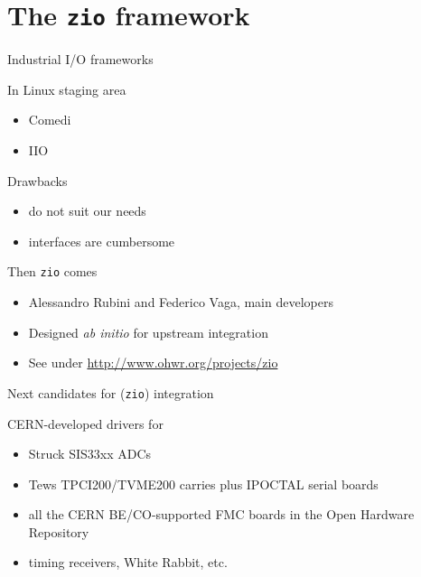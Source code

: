 \documentclass[compress,red]{beamer}
\begin{document}
\section{The \texttt{zio} framework}

\begin{frame}{Industrial I/O frameworks}

\pause
\begin{block}{In Linux staging area}
\begin{itemize}
\item Comedi
\item IIO
\end{itemize}
\end{block}

\pause
\begin{block}{Drawbacks}
\begin{itemize}
\item do not suit our needs
\item interfaces are cumbersome
\end{itemize}
\end{block}

\pause
\begin{block}{Then \texttt{zio} comes}
\begin{itemize}
\item Alessandro Rubini and Federico Vaga, main developers
\item Designed \emph{ab initio} for upstream integration
\item See under \url{http://www.ohwr.org/projects/zio}
\end{itemize}
\end{block}

\end{frame}

\begin{frame}{Next candidates for (\texttt{zio}) integration}

CERN-developed drivers for
\begin{itemize}
\pause
\item Struck SIS33xx ADCs
\pause
\item Tews TPCI200/TVME200 carries plus IPOCTAL serial boards
\pause
\item all the CERN BE/CO-supported FMC boards in the Open Hardware Repository
\pause
\item timing receivers, White Rabbit, etc.
\end{itemize}
\end{frame}
\end{document}
